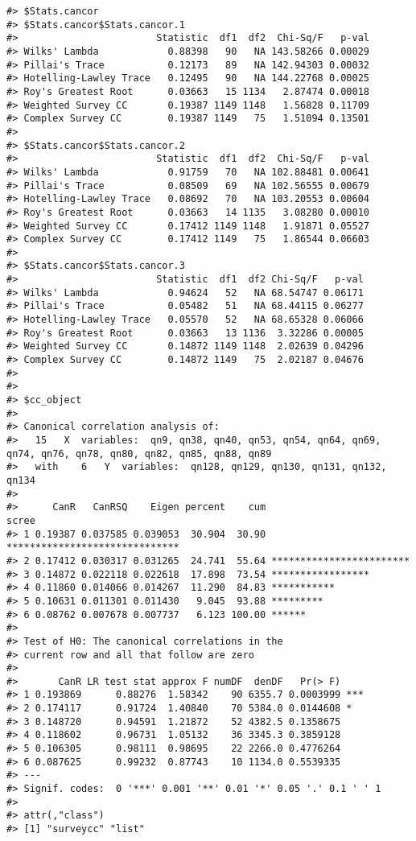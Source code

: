 \begin{verbatim}
#> $Stats.cancor
#> $Stats.cancor$Stats.cancor.1
#>                        Statistic  df1  df2  Chi-Sq/F   p-val
#> Wilks' Lambda            0.88398   90   NA 143.58266 0.00029
#> Pillai's Trace           0.12173   89   NA 142.94303 0.00032
#> Hotelling-Lawley Trace   0.12495   90   NA 144.22768 0.00025
#> Roy's Greatest Root      0.03663   15 1134   2.87474 0.00018
#> Weighted Survey CC       0.19387 1149 1148   1.56828 0.11709
#> Complex Survey CC        0.19387 1149   75   1.51094 0.13501
#> 
#> $Stats.cancor$Stats.cancor.2
#>                        Statistic  df1  df2  Chi-Sq/F   p-val
#> Wilks' Lambda            0.91759   70   NA 102.88481 0.00641
#> Pillai's Trace           0.08509   69   NA 102.56555 0.00679
#> Hotelling-Lawley Trace   0.08692   70   NA 103.20553 0.00604
#> Roy's Greatest Root      0.03663   14 1135   3.08280 0.00010
#> Weighted Survey CC       0.17412 1149 1148   1.91871 0.05527
#> Complex Survey CC        0.17412 1149   75   1.86544 0.06603
#> 
#> $Stats.cancor$Stats.cancor.3
#>                        Statistic  df1  df2 Chi-Sq/F   p-val
#> Wilks' Lambda            0.94624   52   NA 68.54747 0.06171
#> Pillai's Trace           0.05482   51   NA 68.44115 0.06277
#> Hotelling-Lawley Trace   0.05570   52   NA 68.65328 0.06066
#> Roy's Greatest Root      0.03663   13 1136  3.32286 0.00005
#> Weighted Survey CC       0.14872 1149 1148  2.02639 0.04296
#> Complex Survey CC        0.14872 1149   75  2.02187 0.04676
#> 
#> 
#> $cc_object
#> 
#> Canonical correlation analysis of:
#>   15   X  variables:  qn9, qn38, qn40, qn53, qn54, qn64, qn69, qn74, qn76, qn78, qn80, qn82, qn85, qn88, qn89 
#>   with    6   Y  variables:  qn128, qn129, qn130, qn131, qn132, qn134 
#> 
#>      CanR   CanRSQ    Eigen percent    cum                          scree
#> 1 0.19387 0.037585 0.039053  30.904  30.90 ******************************
#> 2 0.17412 0.030317 0.031265  24.741  55.64 ************************      
#> 3 0.14872 0.022118 0.022618  17.898  73.54 *****************             
#> 4 0.11860 0.014066 0.014267  11.290  84.83 ***********                   
#> 5 0.10631 0.011301 0.011430   9.045  93.88 *********                     
#> 6 0.08762 0.007678 0.007737   6.123 100.00 ******                        
#> 
#> Test of H0: The canonical correlations in the 
#> current row and all that follow are zero
#> 
#>       CanR LR test stat approx F numDF  denDF   Pr(> F)    
#> 1 0.193869      0.88276  1.58342    90 6355.7 0.0003999 ***
#> 2 0.174117      0.91724  1.40840    70 5384.0 0.0144608 *  
#> 3 0.148720      0.94591  1.21872    52 4382.5 0.1358675    
#> 4 0.118602      0.96731  1.05132    36 3345.3 0.3859128    
#> 5 0.106305      0.98111  0.98695    22 2266.0 0.4776264    
#> 6 0.087625      0.99232  0.87743    10 1134.0 0.5539335    
#> ---
#> Signif. codes:  0 '***' 0.001 '**' 0.01 '*' 0.05 '.' 0.1 ' ' 1
#> 
#> attr(,"class")
#> [1] "surveycc" "list"
\end{verbatim}

